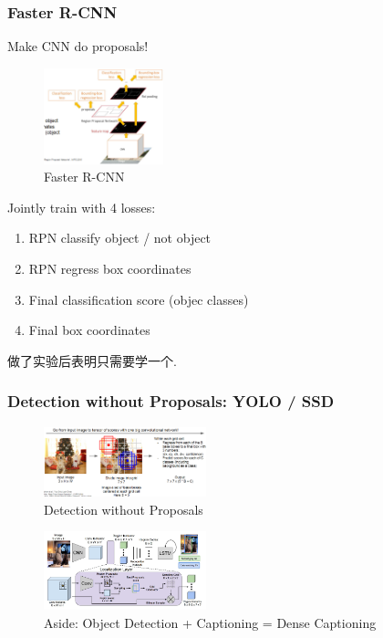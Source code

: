 \subsubsection{Faster R-CNN}
Make CNN do proposals!
\begin{figure}[!htb]
    \centering
    \includegraphics[width=0.309\textwidth]{pic/Lec11/Faster R-CNN}
    \caption{Faster R-CNN}
\end{figure}

Jointly train with 4 losses:
\begin{enumerate}
    \item RPN classify object / not object
    \item RPN regress box coordinates
    \item Final classification score (objec classes)
    \item Final box coordinates
\end{enumerate}
做了实验后表明只需要学一个. 

\subsubsection{Detection without Proposals: YOLO / SSD}
\begin{figure}[!htb]
    \centering
    \includegraphics[width=0.42\textwidth]{pic/Lec11/Detection without Proposals}
    \caption{Detection without Proposals}
\end{figure}

\begin{figure}[!htb]
    \centering
    \includegraphics[width=0.42\textwidth]{pic/Lec11/Object Detection + Captioning = Dense Captioning}
    \caption{Aside: Object Detection + Captioning = Dense Captioning}
\end{figure}


